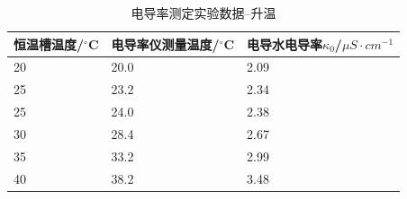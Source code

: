 \documentclass[a4paper]{article}
\begin{document}
\begin{table}[H]
	\caption{电导率测定实验数据--升温}
	\begin{center}
		\begin{tabular}{lll}
			\hline
			恒温槽温度/$^\circ$C	&电导率仪测量温度/$^\circ$C 	&电导水电导率$\kappa_{0}$/$\mu S\cdot cm^{-1}$\\
			\hline
			20&20.0&2.09\\
			25&23.2&2.34\\
			25&24.0&2.38\\
			30&28.4&2.67\\
			35&33.2&2.99\\
			40&38.2&3.48\\
			\hline
		 \end{tabular}
	\end{center}
\end{table}
\end{document}

